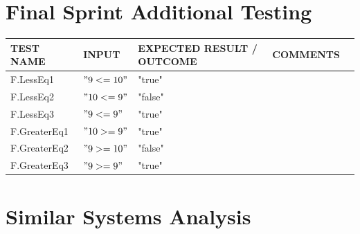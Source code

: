 \documentclass[a4paper, oneside, 11pt]{report}
\begin{document}
    \section{Final Sprint Additional Testing}
    \label{FinalTest}
    \begin{tabular}{|p{1.5in}|p{1.5in}|p{1.6in}|p{1.6in}|p{2.4in}|}
        \hline
        TEST NAME       & INPUT                     & EXPECTED RESULT / OUTCOME              & COMMENTS                                \\
        \hline
        F.LessEq1                         & $"9 <= 10"$                                & "true"        &                \\
        \hline
        F.LessEq2                         & $"10 <= 9"$                                & "false"       &                \\
        \hline
        F.LessEq3                         & $"9 <= 9"$                                 & "true"        &                \\
        \hline
        F.GreaterEq1                      & $"10 >= 9"$                                & "true"        &                \\
        \hline
        F.GreaterEq2                      & $"9 >= 10"$                                & "false"       &                \\
        \hline
        F.GreaterEq3                      & $"9 >= 9"$                                 & "true"        &                \\
        \hline
    \end{tabular}
    \section{Similar Systems Analysis} \label{SSA}
\end{document}
